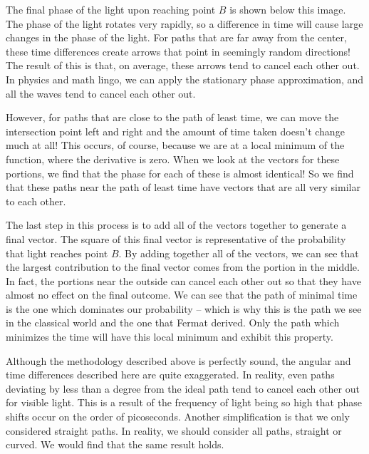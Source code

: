 The final phase of the light upon reaching point $B$ is shown below this image. The phase of the light rotates very rapidly, so a difference in time will cause large changes in the phase of the light. For paths that are far away from the center, these time differences create arrows that point in seemingly random directions! The result of this is that, on average, these arrows tend to cancel each other out. In physics and math lingo, we can apply the stationary phase approximation, and all the waves tend to cancel each other out.

However, for paths that are close to the path of least time, we can move the intersection point left and right and the amount of time taken doesn't change much at all! This occurs, of course, because we are at a local minimum of the function, where the derivative is zero. When we look at the vectors for these portions, we find that the phase for each of these is almost identical! So we find that these paths near the path of least time have vectors that are all very similar to each other.

The last step in this process is to add all of the vectors together to generate a final vector. The square of this final vector is representative of the probability that light reaches point $B$. By adding together all of the vectors, we can see that the largest contribution to the final vector comes from the portion in the middle. In fact, the portions near the outside can cancel each other out so that they have almost no effect on the final outcome. We can see that the path of minimal time is the one which dominates our probability -- which is why this is the path we see in the classical world and the one that Fermat derived. Only the path which minimizes the time will have this local minimum and exhibit this property.

Although the methodology described above is perfectly sound, the angular and time differences described here are quite exaggerated. In reality, even paths deviating by less than a degree from the ideal path tend to cancel each other out for visible light. This is a result of the frequency of light being so high that phase shifts occur on the order of picoseconds. Another simplification is that we only considered straight paths. In reality, we should consider all paths, straight or curved. We would find that the same result holds.

